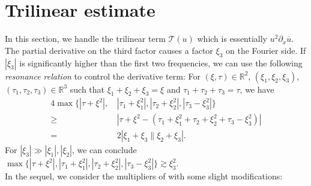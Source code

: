 \documentclass[reqno]{amsart}
\theoremstyle{Definitionl}
\theoremstyle{Definitionk}
\theoremstyle{definition}
\theoremstyle{Satzk}
\theoremstyle{Satzl}
\theoremstyle{Bemerkung}
\begin{document}
\section{Trilinear estimate}
In this section, we handle the trilinear term $\mathcal T(u)$ which is essentially $u^2\partial_x\overline u$. The partial derivative on the third factor causes a factor $\xi_3$ on the Fourier side. If $|\xi_3|$ is significantly higher than the first two frequencies, we can use the following \emph{resonance relation} to control the derivative term: For $(\xi,\tau)\in\mathbb R^2$, $(\xi_1,\xi_2,\xi_3)$, $(\tau_1,\tau_2,\tau_3)\in\mathbb R^3$ such that $\xi_1+\xi_2+\xi_3=\xi$ and $\tau_1+\tau_2+\tau_3=\tau$, we have
\begin{align}
4\max\{|\tau+\xi^2|,&\,|\tau_1+\xi_1^2|,|\tau_2+\xi_2^2|,|\tau_3-\xi_3^2|\}\nonumber\\
\ge&\,|\tau+\xi^2-(\tau_1+\xi_1^2+\tau_2+\xi_2^2+\tau_3-\xi_3^2)|\nonumber\\
=&\,2|\xi_1+\xi_3\|\xi_2+\xi_3|.\label{Resona}
\end{align}
For $|\xi_3|\gg|\xi_1|,|\xi_2|$, we can conclude $\max\{|\tau+\xi^2|,|\tau_1+\xi_1^2|,|\tau_2+\xi_2^2|,|\tau_3-\xi_3^2|\}\gtrsim \xi_3^2$.\\[10pt]
In the sequel, we consider the multipliers of \cite{Herr} with some slight modifications:
\end{document}
